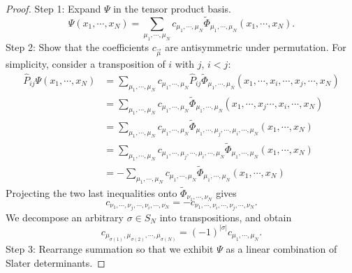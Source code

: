 \documentclass{report}
\theoremstyle{plain}
\theoremstyle{definition}
\begin{document}
\begin{proof}
Step 1: Expand $\Psi$ in the tensor product basis.
\begin{equation}
  \Psi(x_1,\cdots,x_N) = \sum_{\mu_1,\cdots,\mu_N} c_{\mu_1,\cdots,\mu_N}
  \tilde{\Phi}_{\mu_1,\cdots,\mu_N}(x_1,\cdots,x_N).
\end{equation}
Step 2: Show that the coefficients $c_{\vec{\mu}}$ are antisymmetric
under permutation. For simplicity, consider a transposition of $i$ with
$j$, $i<j$:
\begin{equation}
  \begin{split}
  \hat{P}_{ij}\Psi(x_1,\cdots,x_N) 
  &= \sum_{\mu_1,\cdots,\mu_N} c_{\mu_1,\cdots,\mu_N}
  \hat{P}_{ij} \tilde{\Phi}_{\mu_1,\cdots,\mu_N}(x_1,\cdots,x_i,\cdots,x_j,\cdots,x_N) \\
  &= \sum_{\mu_1,\cdots,\mu_N} c_{\mu_1,\cdots,\mu_N}
  \tilde{\Phi}_{\mu_1,\cdots,\mu_N}(x_1,\cdots,x_j\cdots,x_i,\cdots,x_N) \\
  &= \sum_{\mu_1,\cdots,\mu_N} c_{\mu_1,\cdots,\mu_N}
  \tilde{\Phi}_{\mu_1,\cdots,\mu_j,\cdots,\mu_i,\cdots,\mu_N}(x_1,\cdots,x_N) \\
  &= \sum_{\mu_1,\cdots,\mu_N} c_{\mu_1,\cdots,\mu_j,\cdots,\mu_i,\cdots,\mu_N}
  \tilde{\Phi}_{\mu_1,\cdots,\mu_N}(x_1,\cdots,x_N) \\
  &= -\sum_{\mu_1,\cdots,\mu_N} c_{\mu_1,\cdots,\mu_N}
  \tilde{\Phi}_{\mu_1,\cdots,\mu_N}(x_1,\cdots,x_N)
\end{split}
\end{equation}
Projecting the two last inequalities onto
$\tilde{\Phi}_{\nu_1,\cdots,\nu_N}$ gives
\begin{equation}
  c_{\nu_1,\cdots,\nu_j,\cdots,\nu_i,\cdots,\nu_N} = - c_{\nu_1,\cdots,\nu_i,\cdots,\nu_j,\cdots,\nu_N}.
\end{equation}
We decompose an arbitrary $\sigma\in S_N$ into transpositions, and obtain
\begin{equation}
  c_{\mu_{\sigma(1)},\mu_{\sigma(2)},\cdots,\mu_{\sigma(N)}} =
  (-1)^{|\sigma|} c_{\mu_1,\cdots,\mu_N}.
\end{equation}
Step 3: Rearrange summation so that we exhibit $\Psi$ as a linear
combination of Slater determinants.


\end{proof}
\end{document}
